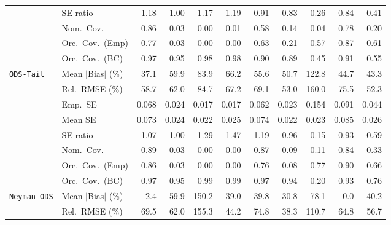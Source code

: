 \begin{landscape}
\begin{longtable}{llrrrrrrrrr}
 & SE ratio & 1.18 & \cellcolor{rankone}1.00 & 1.17 & 1.19 & \cellcolor{ranktwo}0.91 & 0.83 & 0.26 & \cellcolor{rankthree}0.84 & 0.41 \\
 & Nom.\ Cov. & \cellcolor{rankone}0.86 & 0.03 & 0.00 & 0.01 & \cellcolor{rankthree}0.58 & 0.14 & 0.04 & \cellcolor{ranktwo}0.78 & 0.20 \\
 & Orc.\ Cov.\ (Emp) & \cellcolor{ranktwo}0.77 & 0.03 & 0.00 & 0.00 & \cellcolor{rankthree}0.63 & 0.21 & 0.57 & \cellcolor{rankone}0.87 & 0.61 \\
 & Orc.\ Cov.\ (BC) & \cellcolor{ranktwo}0.97 & \cellcolor{rankone}0.95 & \cellcolor{rankthree}0.98 & \cellcolor{rankthree}0.98 & 0.90 & 0.89 & 0.45 & 0.91 & 0.55 \\
\addlinespace[2pt]
\quad \texttt{ODS-Tail} & Mean $|$Bias$|$ (\%) & \cellcolor{rankone}37.1 & 59.9 & 83.9 & 66.2 & 55.6 & 50.7 & 122.8 & \cellcolor{rankthree}44.7 & \cellcolor{ranktwo}43.3 \\
 & Rel.\ RMSE (\%) & \cellcolor{rankthree}58.7 & 62.0 & 84.7 & 67.2 & 69.1 & \cellcolor{ranktwo}53.0 & 160.0 & 75.5 & \cellcolor{rankone}52.3 \\
 & Emp.\ SE & 0.068 & 0.024 & 0.017 & 0.017 & 0.062 & 0.023 & 0.154 & 0.091 & 0.044 \\
 & Mean SE & 0.073 & 0.024 & 0.022 & 0.025 & 0.074 & 0.022 & 0.023 & 0.085 & 0.026 \\
 & SE ratio & \cellcolor{rankthree}1.07 & \cellcolor{rankone}1.00 & 1.29 & 1.47 & 1.19 & \cellcolor{ranktwo}0.96 & 0.15 & \cellcolor{rankthree}0.93 & 0.59 \\
 & Nom.\ Cov. & \cellcolor{rankone}0.89 & 0.03 & 0.00 & 0.00 & \cellcolor{ranktwo}0.87 & 0.09 & 0.11 & \cellcolor{rankthree}0.84 & 0.33 \\
 & Orc.\ Cov.\ (Emp) & \cellcolor{ranktwo}0.86 & 0.03 & 0.00 & 0.00 & 0.76 & 0.08 & \cellcolor{rankthree}0.77 & \cellcolor{rankone}0.90 & 0.66 \\
 & Orc.\ Cov.\ (BC) & \cellcolor{rankthree}0.97 & \cellcolor{rankone}0.95 & 0.99 & 0.99 & \cellcolor{rankthree}0.97 & \cellcolor{ranktwo}0.94 & 0.20 & \cellcolor{rankthree}0.93 & 0.76 \\
\addlinespace[2pt]
\quad \texttt{Neyman-ODS} & Mean $|$Bias$|$ (\%) & \cellcolor{ranktwo}2.4 & 59.9 & 150.2 & 39.0 & 39.8 & \cellcolor{rankthree}30.8 & 78.1 & \cellcolor{rankone}0.0 & 40.2 \\
 & Rel.\ RMSE (\%) & 69.5 & 62.0 & 155.3 & \cellcolor{ranktwo}44.2 & 74.8 & \cellcolor{rankone}38.3 & 110.7 & 64.8 & \cellcolor{rankthree}56.7 \\

\end{longtable}
\end{landscape}
